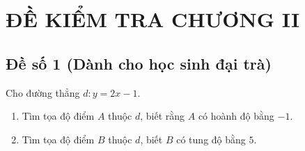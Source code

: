 
\section{ĐỀ KIỂM TRA CHƯƠNG II}
\subsection{Đề số 1 (Dành cho học sinh đại trà)}
\begin{ex}
Cho đường thẳng $d:y=2x-1$.
\begin{enumerate}
	\item Tìm tọa độ điểm $A$ thuộc $d$, biết rằng $A$ có hoành độ bằng $-1$.
	\item Tìm tọa độ điểm $B$ thuộc $d$, biết $B$ có tung độ bằng $5$.
	\end{enumerate}
\end{ex}
